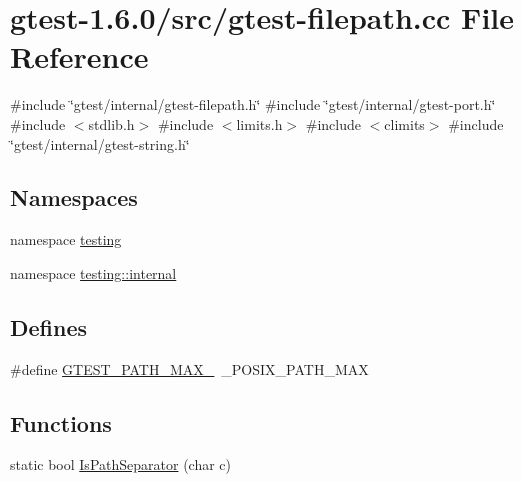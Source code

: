 \hypertarget{gtest-filepath_8cc}{\section{gtest-\/1.6.0/src/gtest-\/filepath.cc \-File \-Reference}
\label{dc/d20/gtest-filepath_8cc}
}
{\ttfamily \#include \char`\"{}gtest/internal/gtest-\/filepath.\-h\char`\"{}}\*
{\ttfamily \#include \char`\"{}gtest/internal/gtest-\/port.\-h\char`\"{}}\*
{\ttfamily \#include $<$stdlib.\-h$>$}\*
{\ttfamily \#include $<$limits.\-h$>$}\*
{\ttfamily \#include $<$climits$>$}\*
{\ttfamily \#include \char`\"{}gtest/internal/gtest-\/string.\-h\char`\"{}}\*
\subsection*{\-Namespaces}
\begin{DoxyCompactItemize}
\item 
namespace \hyperlink{namespacetesting}{testing}
\item 
namespace \hyperlink{namespacetesting_1_1internal}{testing\-::internal}
\end{DoxyCompactItemize}
\subsection*{\-Defines}
\begin{DoxyCompactItemize}
\item 
\#define \hyperlink{gtest-filepath_8cc_ad9d445747785a9271a57cf1d392b89ad}{\-G\-T\-E\-S\-T\-\_\-\-P\-A\-T\-H\-\_\-\-M\-A\-X\-\_\-}~\-\_\-\-P\-O\-S\-I\-X\-\_\-\-P\-A\-T\-H\-\_\-\-M\-A\-X
\end{DoxyCompactItemize}
\subsection*{\-Functions}
\begin{DoxyCompactItemize}
\item 
static bool \hyperlink{namespacetesting_1_1internal_a7ee4a5b7791bc60422f53d0ec2d0f6a3}{\-Is\-Path\-Separator} (char c)
\end{DoxyCompactItemize}


